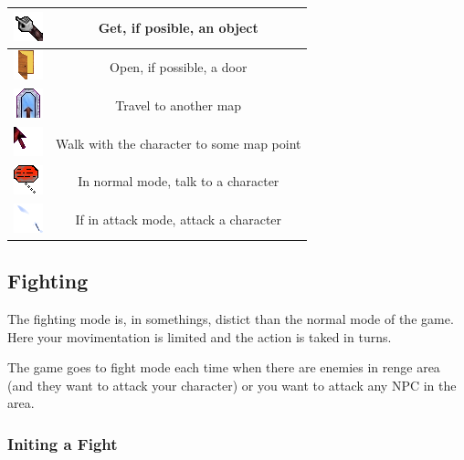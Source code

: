 \documentclass[ letterpaper,12pt]{article}
\begin{document}
\begin{tabular}{|c|c|}
\hline
 \includegraphics{Get.png} & Get, if posible, an object\\
\hline
 \includegraphics{Door.png} & Open, if possible, a door\\
\hline
 \includegraphics{MapTravel.png} & Travel to another map\\
\hline
 \includegraphics{Walk.png} & Walk with the character to some map point\\
\hline
 \includegraphics{talk.png} & In normal mode, talk to a character\\
\hline
 \includegraphics{Attack.png} & If in attack mode, attack a character\\
\hline
\end{tabular}

\subsection{Fighting}

The fighting mode is, in somethings, distict than the normal mode of the game. Here your movimentation is limited and the action is taked in turns.

The game goes to fight mode each time when there are enemies in renge area (and they want to attack your character) or you want to attack any NPC in the area.

\subsubsection{Initing a Fight}
\end{document}
